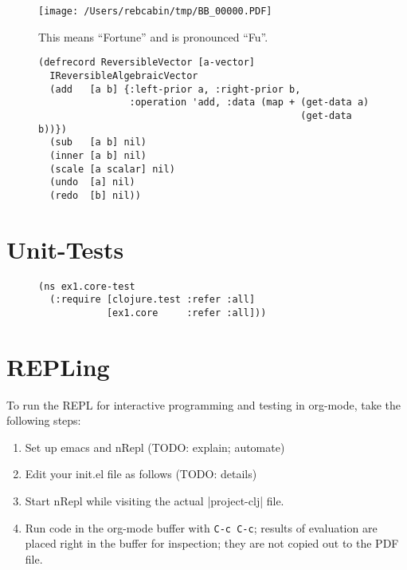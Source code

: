 \documentclass[11pt]{article}
\begin{document}
\begin{figure}
  \centering
  \texttt{[image: /Users/rebcabin/tmp/BB\_00000.PDF]}
  \caption{\label{fig:fufortune}This means ``Fortune'' and is pronounced ``Fu''.}
\end{figure}

\begin{figure}[H]
\label{reversible-algebraic-vector-on-vector}
\begin{verbatim}
(defrecord ReversibleVector [a-vector]
  IReversibleAlgebraicVector
  (add   [a b] {:left-prior a, :right-prior b,
                :operation 'add, :data (map + (get-data a)
                                              (get-data b))})
  (sub   [a b] nil)
  (inner [a b] nil)
  (scale [a scalar] nil)
  (undo  [a] nil)
  (redo  [b] nil))
\end{verbatim}
\end{figure}
\section{Unit-Tests}
\label{sec-3}

\begin{figure}[H]
\label{test-namespace}
\begin{verbatim}
(ns ex1.core-test
  (:require [clojure.test :refer :all]
            [ex1.core     :refer :all]))
\end{verbatim}
\end{figure}
\section{REPLing}
\label{sec-4}
\label{sec:emacs-repl}
To run the REPL for interactive programming and testing in org-mode,
take the following steps:
\begin{enumerate}
\item Set up emacs and nRepl (TODO: explain; automate)
\item Edit your init.el file as follows (TODO: details)
\item Start nRepl while visiting the actual |project-clj| file.
\item Run code in the org-mode buffer with \verb|C-c C-c|; results of
evaluation are placed right in the buffer for inspection; they are
not copied out to the PDF file.
\end{enumerate}
\end{document}
